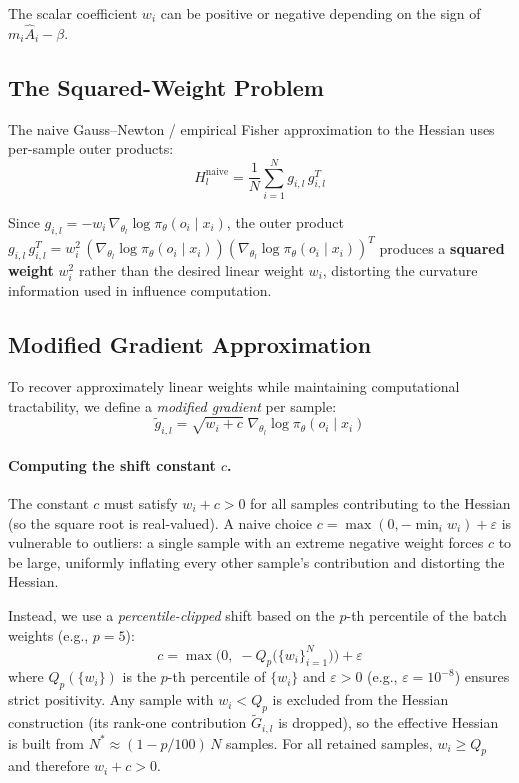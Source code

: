 \documentclass{article}
\begin{document}
The scalar coefficient $w_i$ can be positive or negative depending on the sign of $m_i\hat{A}_i - \beta$.

\subsection{The Squared-Weight Problem}

The naive Gauss--Newton / empirical Fisher approximation to the Hessian uses per-sample outer products:
\begin{equation}
    H_l^{\mathrm{naive}} = \frac{1}{N}\sum_{i=1}^N g_{i,l}\,g_{i,l}^T
\end{equation}

Since $g_{i,l} = -w_i\,\nabla_{\theta_l}\log\pi_\theta(o_i\mid x_i)$, the outer product $g_{i,l}\,g_{i,l}^T = w_i^2\,(\nabla_{\theta_l}\log\pi_\theta(o_i\mid x_i))(\nabla_{\theta_l}\log\pi_\theta(o_i\mid x_i))^T$ produces a \textbf{squared weight} $w_i^2$ rather than the desired linear weight $w_i$, distorting the curvature information used in influence computation.

\subsection{Modified Gradient Approximation}\label{sec:modified_grad}

To recover approximately linear weights while maintaining computational tractability, we define a \emph{modified gradient} per sample:
\begin{equation}\label{eq:modified_grad}
    \tilde{g}_{i,l} = \sqrt{w_i+c}\;\nabla_{\theta_l}\log\pi_\theta(o_i\mid x_i)
\end{equation}

\paragraph{Computing the shift constant $c$.}
The constant $c$ must satisfy $w_i + c > 0$ for all samples contributing to the Hessian (so the square root is real-valued).
A naive choice $c = \max(0,-\min_i w_i)+\varepsilon$ is vulnerable to outliers: a single sample with an extreme negative weight forces $c$ to be large, uniformly inflating every other sample's contribution and distorting the Hessian.

Instead, we use a \emph{percentile-clipped} shift based on the $p$-th percentile of the batch weights (e.g., $p=5$):
\begin{equation}\label{eq:c_formula}
    c = \max\!\bigl(0,\;-Q_p\bigl(\{w_i\}_{i=1}^N\bigr)\bigr) + \varepsilon
\end{equation}
where $Q_p(\{w_i\})$ is the $p$-th percentile of $\{w_i\}$ and $\varepsilon>0$ (e.g., $\varepsilon=10^{-8}$) ensures strict positivity.
Any sample with $w_i < Q_p$ is excluded from the Hessian construction (its rank-one contribution $\tilde{G}_{i,l}$ is dropped), so the effective Hessian is built from $N^* \approx (1-p/100)\,N$ samples.
For all retained samples, $w_i \ge Q_p$ and therefore $w_i + c > 0$.
\end{document}
